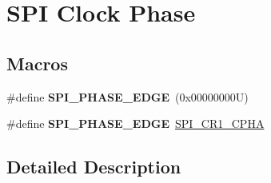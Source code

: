 \hypertarget{group___s_p_i___clock___phase}{}\section{S\+PI Clock Phase}
\label{group___s_p_i___clock___phase}
\subsection*{Macros}
\begin{DoxyCompactItemize}
\item 
\mbox{\label{group___s_p_i___clock___phase_ga208be78b79c51df200a495c4d2110b57}} 
\#define {\bfseries S\+P\+I\+\_\+\+P\+H\+A\+S\+E\+\_\+E\+D\+GE}~(0x00000000\+U)
\item 
\mbox{\label{group___s_p_i___clock___phase_ga960275ac1d01d302c48e713399990c36}} 
\#define {\bfseries S\+P\+I\+\_\+\+P\+H\+A\+S\+E\+\_\+E\+D\+GE}~\mbox{\hyperlink{group___peripheral___registers___bits___definition_ga97602d8ded14bbd2c1deadaf308755a3}{S\+P\+I\+\_\+\+C\+R1\+\_\+\+C\+P\+HA}}
\end{DoxyCompactItemize}


\subsection{Detailed Description}
